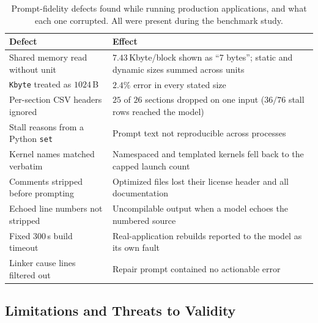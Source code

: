 \begin{table}[t]
\centering
\footnotesize
\setlength{\tabcolsep}{3pt}
\caption{Prompt-fidelity defects found while running production applications, and what each one
  corrupted. All were present during the benchmark study.}
\label{tab:defects}
\begin{tabular}{@{}p{}p{}@{}}
\toprule
\textbf{Defect} & \textbf{Effect} \\
\midrule
Shared memory read without unit & $7.43$\,Kbyte/block shown as ``7 bytes''; static and dynamic sizes
  summed across units \\
\texttt{Kbyte} treated as $1024$\,B & $2.4\%$ error in every stated size \\
Per-section CSV headers ignored & $25$ of $26$ sections dropped on one input ($36/76$ stall rows
  reached the model) \\
Stall reasons from a Python \texttt{set} & Prompt text not reproducible across processes \\
Kernel names matched verbatim & Namespaced and templated kernels fell back to the capped launch count \\
Comments stripped before prompting & Optimized files lost their license header and all documentation \\
Echoed line numbers not stripped & Uncompilable output when a model echoes the numbered source \\
Fixed $300$\,s build timeout & Real-application rebuilds reported to the model as its own fault \\
Linker cause lines filtered out & Repair prompt contained no actionable error \\
\bottomrule
\end{tabular}
\end{table}

\subsection{Limitations and Threats to Validity}
\label{sec:limits}
